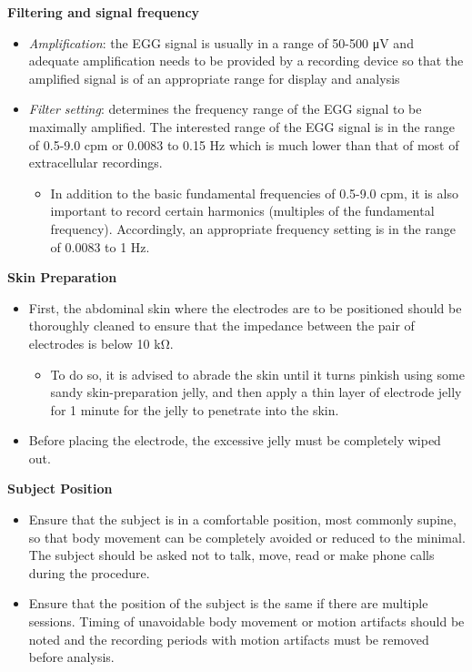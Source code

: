 \documentclass[
]{book}
\providecommand{\tightlist}{%
  \setlength{\itemsep}{0pt}\setlength{\parskip}{0pt}}
\begin{document}
\textbf{Filtering and signal frequency}

\begin{itemize}
\tightlist
\item
  \emph{Amplification}: the EGG signal is usually in a range of 50-500 μV and adequate amplification needs to be provided by a recording device so that the amplified signal is of an appropriate range for display and analysis
\item
  \emph{Filter setting}: determines the frequency range of the EGG signal to be maximally amplified. The interested range of the EGG signal is in the range of 0.5-9.0 cpm or 0.0083 to 0.15 Hz which is much lower than that of most of extracellular recordings.

  \begin{itemize}
  \tightlist
  \item
    In addition to the basic fundamental frequencies of 0.5-9.0 cpm, it is also important to record certain harmonics (multiples of the fundamental frequency). Accordingly, an appropriate frequency setting is in the range of 0.0083 to 1 Hz.
  \end{itemize}
\end{itemize}

\textbf{Skin Preparation}

\begin{itemize}
\tightlist
\item
  First, the abdominal skin where the electrodes are to be positioned should be thoroughly cleaned to ensure that the impedance between the pair of electrodes is below 10 kΩ.

  \begin{itemize}
  \tightlist
  \item
    To do so, it is advised to abrade the skin until it turns pinkish using some sandy skin-preparation jelly, and then apply a thin layer of electrode jelly for 1 minute for the jelly to penetrate into the skin.
  \end{itemize}
\item
  Before placing the electrode, the excessive jelly must be completely wiped out.
\end{itemize}

\textbf{Subject Position}

\begin{itemize}
\tightlist
\item
  Ensure that the subject is in a comfortable position, most commonly supine, so that body movement can be completely avoided or reduced to the minimal. The subject should be asked not to talk, move, read or make phone calls during the procedure.
\item
  Ensure that the position of the subject is the same if there are multiple sessions. Timing of unavoidable body movement or motion artifacts should be noted and the recording periods with motion artifacts must be removed before analysis.
\end{itemize}
\end{document}
